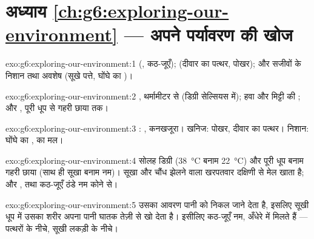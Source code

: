 \section*{अध्याय \ref{ch:g6:exploring-our-environment} --- अपने पर्यावरण की खोज}

\begin{solution}{exo:g6:exploring-our-environment:1}
 (, कठ-जूएँ);  (दीवार का पत्थर, पोखर); और सजीवों के
निशान तथा अवशेष (सूखे पत्ते, घोंघे का )।
\end{solution}

\begin{solution}{exo:g6:exploring-our-environment:2}
, थर्मामीटर से (डिग्री सेल्सियस में); हवा और मिट्टी की ; और
, पूरी धूप से गहरी छाया तक।
\end{solution}

\begin{solution}{exo:g6:exploring-our-environment:3}
: , कनखजूरा। खनिज: पोखर, दीवार का पत्थर। निशान: घोंघे का ,
 का मल।
\end{solution}

\begin{solution}{exo:g6:exploring-our-environment:4}
सोलह डिग्री (\qty{38}{\degreeCelsius} बनाम
\qty{22}{\degreeCelsius}) और पूरी धूप बनाम गहरी छाया (साथ ही सूखा बनाम
नम)। सूखा और चौंध झेलने वाला खरपतवार दक्षिणी  से मेल खाता है; और
,  तथा कठ-जूएँ ठंडे नम कोने से।
\end{solution}

\begin{solution}{exo:g6:exploring-our-environment:5}
उसका आवरण पानी को निकल जाने देता है, इसलिए सूखी धूप में उसका शरीर अपना
पानी घातक तेज़ी से खो देता है। इसीलिए कठ-जूएँ नम, अँधेरे 
में मिलते हैं --- पत्थरों के नीचे, सूखी लकड़ी के नीचे।
\end{solution}

